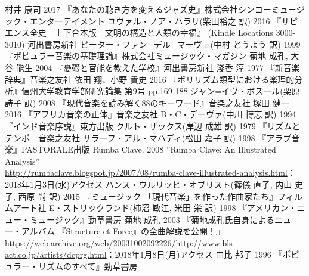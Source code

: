 \documentclass[uplatex,dvipdfmx]{ujarticle}
\begin{document}

\begin{thebibliography}{99}
 村井 康司 2017 『あなたの聴き方を変えるジャズ史』株式会社シンコーミュージック・エンターテイメント
ユヴァル・ノア・ハラリ(柴田裕之 訳) 2016 『サピエンス全史　上下合本版　文明の構造と人類の幸福』 (Kindle Locations 3000-3010) 河出書房新社
 ピーター・ファン=デル=マーヴェ(中村 とうよう 訳) 1999 『ポピュラー音楽の基礎理論』株式会社ミュージック・マガジン
 菊地 成孔, 大谷 能生 2004 『憂鬱と官能を教えた学校』河出書房新社
 淺香 淳 1977 『新音楽辞典』音楽之友社
 依田 翔、小野 貴史 2016 『ポリリズム類型における楽理的分析』信州大学教育学部研究論集 第9号 pp.169-188
 ジャン=イヴ・ボスール(栗原 詩子 訳) 2008 『現代音楽を読み解く88のキーワード』音楽之友社
 塚田 健一 2016 『アフリカ音楽の正体』音楽之友社
 B・C・デーヴァ(中川 博志 訳) 1994 『インド音楽序説』東方出版
 クルト・ザックス(岸辺 成雄 訳) 1979 『リズムとテンポ』音楽之友社
 サラーフ・アル・マハディ(松田 嘉子 訳) 1998 『アラブ音楽』PASTORALE出版
 Rumba Clave. 2008 ''Rumba Clave: An Illustrated Analysis''\\
\url{http://rumbaclave.blogspot.jp/2007/08/rumba-clave-illustrated-analysis.html}：2018年1月3日(水)アクセス
 ハンス・ウルリッヒ・オブリスト(篠儀 直子, 内山 史子, 西原 尚 訳) 2015 『ミュージック 「現代音楽」を作った作曲家たち』フィルムアート社
 E・ストリックランド(柿沼 敏江, 米田 栄 訳) 1998 『アメリカン・ニュー・ミュージック』勁草書房
 菊地 成孔 2003 『菊地成孔氏自身によるニュー・アルバム 『Structure et Force』の全曲解説を公開！』 \url{https://web.archive.org/web/20031002092226/http://www.bls-act.co.jp/artists/dcprg.html}：2018年1月8日(月)アクセス
 由比 邦子 1996 『ポピュラー・リズムのすべて』勁草書房
\end{thebibliography}
\end{document}
